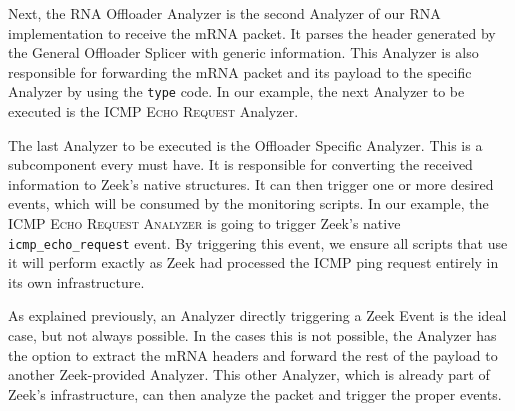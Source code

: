 
Next, the RNA Offloader Analyzer is the second Analyzer of our RNA implementation to receive the mRNA packet. It parses the header generated by the General Offloader Splicer with \Offloader{} generic information. This Analyzer is also responsible for forwarding the mRNA packet and its payload to the \Offloader{} specific Analyzer by using the \Offloader{} \texttt{type} code. In our example, the next Analyzer to be executed is the \textsc{ICMP Echo Request} Analyzer. 


The last Analyzer to be executed is the Offloader Specific Analyzer. This is a subcomponent every \Offloader{} must have. It is responsible for converting the received information to Zeek's native structures. It can then trigger one or more desired events, which will be consumed by the monitoring scripts. In our example, the \textsc{ICMP Echo Request Analyzer} is going to trigger Zeek's native \texttt{icmp\_echo\_request} event. By triggering this event, we ensure all scripts that use it will perform exactly as Zeek had processed the ICMP ping request entirely in its own infrastructure.

As explained previously, an Analyzer directly triggering a Zeek Event is the ideal case, but not always possible. In the cases this is not possible, the Analyzer has the option to extract the mRNA headers and forward the rest of the payload to another Zeek-provided Analyzer. This other Analyzer, which is already part of Zeek's infrastructure, can then analyze the packet and trigger the proper events.
